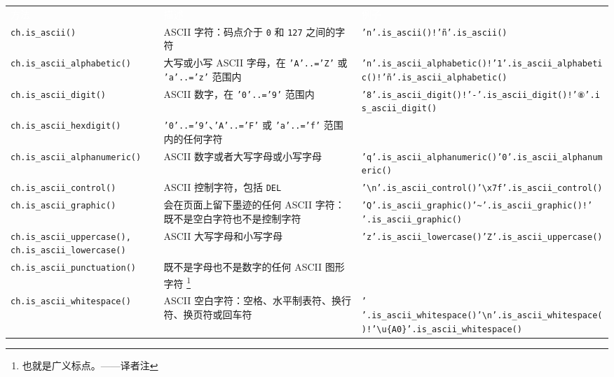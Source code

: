 \myTableBegin
\begin{tabularx}{\textwidth}{@{}>{\hsize=0.883\hsize\raggedright\arraybackslash}X>{\hsize=0.947\hsize\raggedright\arraybackslash}X>{\hsize=1.170\hsize\raggedright\arraybackslash}X@{}}
\rowcolor{tabhead}\textcolor{white}{方法} & \textcolor{white}{描述} & \textcolor{white}{例子} \\
\texttt{ch.is\_ascii()} & ASCII 字符：码点介于 \texttt{0} 和 \texttt{127} 之间的字符 & \texttt{'n'.is\_ascii()}\newline{}\texttt{!'ñ'.is\_ascii()} \\
\texttt{ch.is\_ascii\_alphabetic()} & 大写或小写 ASCII 字母，在 \texttt{'A'..='Z'} 或 \texttt{'a'..='z'} 范围内 & \texttt{'n'.is\_ascii\_alphabetic()}\newline{}\texttt{!'1'.is\_ascii\_alphabetic()}\newline{}\texttt{!'ñ'.is\_ascii\_alphabetic()} \\
\texttt{ch.is\_ascii\_digit()} & ASCII 数字，在 \texttt{'0'..='9'} 范围内 & \texttt{'8'.is\_ascii\_digit()}\newline{}\texttt{!'-'.is\_ascii\_digit()}\newline{}\texttt{!'⑧'.is\_ascii\_digit()} \\
\texttt{ch.is\_ascii\_hexdigit()} & \texttt{'0'..='9'}、\texttt{'A'..='F'} 或 \texttt{'a'..='f'} 范围内的任何字符 &  \\
\texttt{ch.is\_ascii\_alphanumeric()} & ASCII 数字或者大写字母或小写字母 & \texttt{'q'.is\_ascii\_alphanumeric()}\newline{}\texttt{'0'.is\_ascii\_alphanumeric()} \\
\texttt{ch.is\_ascii\_control()} & ASCII 控制字符，包括 \texttt{DEL} & \texttt{'\textbackslash{}n'.is\_ascii\_control()}\newline{}\texttt{'\textbackslash{}x7f'.is\_ascii\_control()} \\
\texttt{ch.is\_ascii\_graphic()} & 会在页面上留下墨迹的任何 ASCII 字符：既不是空白字符也不是控制字符 & \texttt{'Q'.is\_ascii\_graphic()}\newline{}\texttt{'\textasciitilde{}'.is\_ascii\_graphic()}\newline{}\texttt{!' '.is\_ascii\_graphic()} \\
\texttt{ch.is\_ascii\_uppercase(), ch.is\_ascii\_lowercase()} & ASCII 大写字母和小写字母 & \texttt{'z'.is\_ascii\_lowercase()}\newline{}\texttt{'Z'.is\_ascii\_uppercase()} \\
\texttt{ch.is\_ascii\_punctuation()} & 既不是字母也不是数字的任何 ASCII 图形字符 \footnote{也就是广义标点。——译者注} &  \\
\texttt{ch.is\_ascii\_whitespace()} & ASCII 空白字符：空格、水平制表符、换行符、换页符或回车符 & \texttt{' '.is\_ascii\_whitespace()}\newline{}\texttt{'\textbackslash{}n'.is\_ascii\_whitespace()}\newline{}\texttt{!'\textbackslash{}u\{A0\}'.is\_ascii\_whitespace()} \\
\end{tabularx}
\myTableEnd

